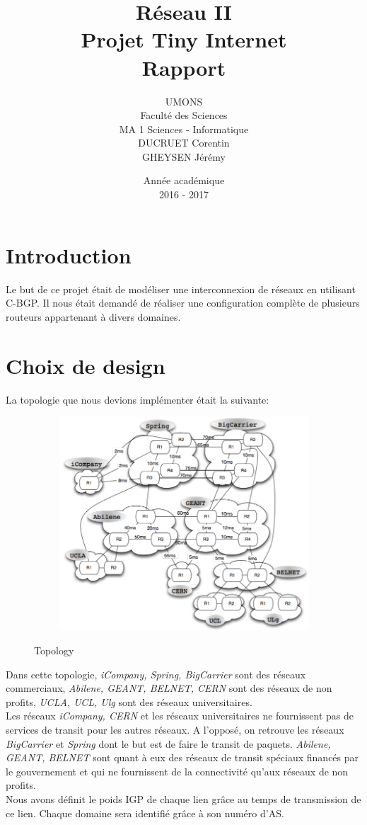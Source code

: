 \documentclass[a4paper,12pt]{report} %
\title{Réseau II \\ Projet Tiny Internet\\ Rapport}
\author{UMONS\\Faculté des Sciences\\MA 1 Sciences - Informatique\\DUCRUET Corentin \\GHEYSEN Jérémy}
\date{Année académique\\2016 - 2017}
\begin{document}
 
\maketitle
\newpage 
\tableofcontents 
\newpage
\raggedright

\section{Introduction}
Le but de ce projet était de modéliser une interconnexion de réseaux en utilisant C-BGP. Il nous était demandé de réaliser une configuration complète de plusieurs routeurs appartenant à divers domaines.

\section{Choix de design}
La topologie que nous devions implémenter était la suivante:
\begin{figure}[!h] %
		\centering
		\includegraphics[width=120mm,height=80mm]{topologie}
		\label{topo}
		\caption{Topology}
	\end{figure} 

Dans cette topologie, \textit{iCompany, Spring, BigCarrier} sont des réseaux commerciaux,  \textit{Abilene, GEANT, BELNET, CERN} sont des réseaux de non profits, \textit{UCLA, UCL, Ulg} sont des réseaux universitaires.\\
Les réseaux \textit{iCompany, CERN} et les réseaux universitaires ne fournissent pas de services de transit pour les autres réseaux. A l'opposé, on retrouve les réseaux \textit{BigCarrier} et \textit{Spring} dont le but est de faire le transit de paquets. \textit{Abilene, GEANT, BELNET} sont quant à eux des réseaux de transit spéciaux financés par le gouvernement et qui ne fournissent de la connectivité qu'aux réseaux  de non profits.\\
Nous avons définit le poids IGP de chaque lien grâce au temps de transmission de ce lien. Chaque domaine sera identifié grâce à son numéro d'AS.\\
\end{document}

